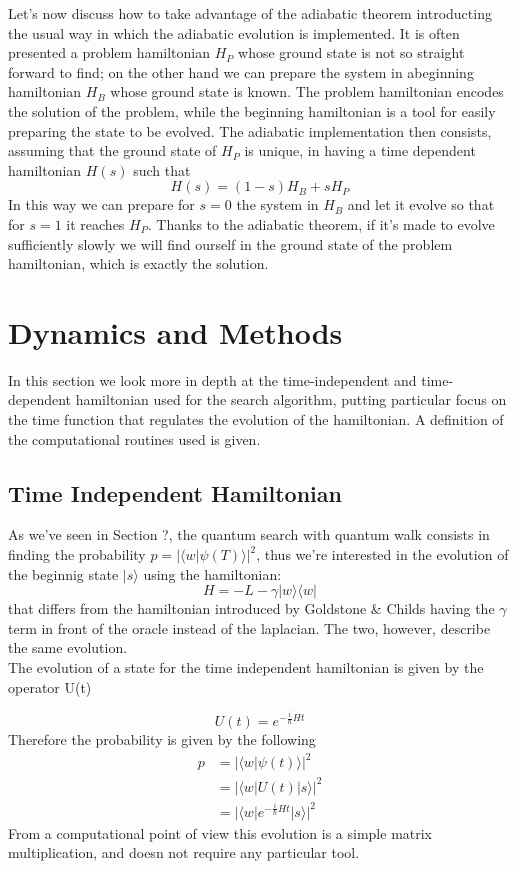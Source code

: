 \documentclass[aps,pra,reprint, onecolumn]{revtex4-2}
\begin{document}
Let's now discuss how to take advantage of the adiabatic theorem introducting the usual way in which the adiabatic evolution is implemented. It is often presented a problem hamiltonian $H_P$ whose ground state is not so straight forward to find; on the other hand we can prepare the system in abeginning hamiltonian $H_B$ whose ground state is known. The problem hamiltonian encodes the solution of the problem, while the beginning hamiltonian is a tool for easily preparing the state to be evolved. The adiabatic implementation then consists, assuming that the ground state of $H_P$ is unique, in having a time dependent hamiltonian $H(s)$ such that
\begin{equation}
	H(s) = (1-s)H_B + s H_P
\end{equation}
In this way we can prepare for $s=0$ the system in $H_B$ and let it evolve so that for $s=1$ it reaches $H_P$. Thanks to the adiabatic theorem, if it's made to evolve sufficiently slowly we will find ourself in the ground state of the problem hamiltonian, which is exactly the solution.


\section{Dynamics and Methods}
In this section we look more in depth at the time-independent and time-dependent hamiltonian used for the search algorithm, putting particular focus on the time function that regulates the evolution of the hamiltonian. A definition of the computational routines used is given.
\subsection{Time Independent Hamiltonian}
As we've seen in Section ?, the quantum search with quantum walk consists in finding the probability $p = |\langle w|\psi(T)\rangle|^2$, thus we're interested in the evolution of the beginnig state $|s\rangle$ using the hamiltonian:
\begin{equation}
H = -L -\gamma|w\rangle\langle w|
\end{equation}
that differs from the hamiltonian introduced by Goldstone \& Childs having the $\gamma$ term in front of the oracle instead of the laplacian. The two, however, describe the same evolution. \\
The evolution of a state for the time independent hamiltonian is given by the operator U(t)

\begin{equation}
  U(t) = e^{-\frac{i}{\hbar}Ht}
\end{equation}
Therefore the probability is given by the following
\begin{equation*}
\begin{split}
  p & = |\langle w|\psi(t)\rangle|^2  \\ & = |\langle w|U(t)|s\rangle| ^2 \\& =|\langle w|e^{-\frac{i}{\hbar}Ht}|s\rangle|^2
\end{split}
\end{equation*}
From a computational point of view this evolution is a simple matrix multiplication, and doesn not require any particular tool.
\end{document}
